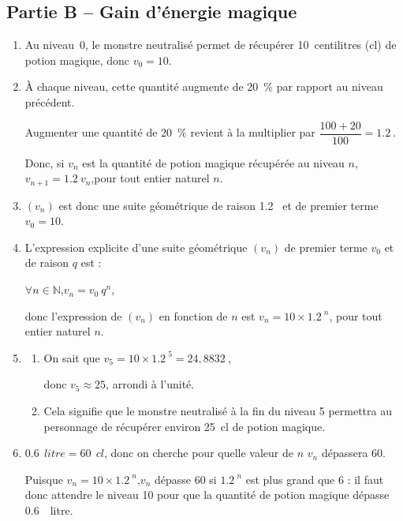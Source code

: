 \documentclass[10pt]{article}
\providecommand{\N}{\mathbb{N}}
\providecommand{\np}[2][]{{#2~#1}}
\begin{document}
\subsection*{Partie B -- Gain d'énergie magique}
\begin{enumerate}
	\item Au niveau~0, le monstre neutralisé permet de récupérer 10~centilitres (cl) de potion magique, donc $v_0 = 10$.

	\item À chaque niveau, cette quantité augmente de 20~\% par rapport au niveau précédent.

	Augmenter une quantité de 20~\% revient à la multiplier par $\dfrac{100+20}{100} = \np{1.2}$.

	Donc, si $v_n$ est la quantité de potion magique récupérée au niveau $n$, \quad $v_{n+1} = \np{1.2} v_n$,\quad pour tout entier naturel $n$.

	\item $(v_n)$ est donc une suite géométrique de raison \np{1.2} et de premier terme $v_0 = 10$.

	\item L'expression explicite d'une suite géométrique $(v_n)$ de premier terme $v_0$ et de raison $q$ est :

	$\forall n \in \N$,\quad $v_n = v_0~q^n$,

	donc l'expression de $(v_n)$ en fonction de $n$ est $ v_n = 10 \times \np{1.2}^n$, pour tout entier naturel $n$.

	\item \begin{enumerate}
		\item On sait que \quad $v_5 = 10\times \np{1.2}^5 = \np{24,8832}$,

		donc $v_5\approx25$, arrondi à l'unité.

		\item Cela signifie que le monstre neutralisé à la fin du niveau 5 permettra au personnage de récupérer environ 25~cl de potion magique.
	\end{enumerate}

	\item $\np[~litre]{0.6} = \np[~cl]{60}$, donc on cherche pour quelle valeur de $n$ $v_n$ dépassera 60.

	Puisque $ v_n = 10 \times \np{1.2}^n$,\quad $v_n$ dépasse 60 si $\np{1.2}^n$ est plus grand que 6 : il faut donc attendre le niveau 10 pour que la quantité de potion magique dépasse \np{0.6}~litre.
\end{enumerate}

\end{document}
